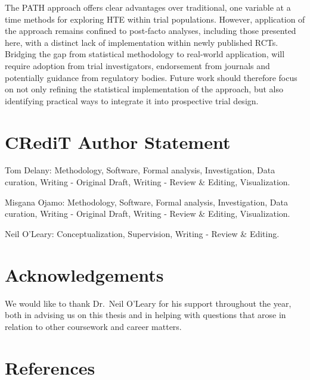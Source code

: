 \documentclass{article}
\begin{document}
The PATH approach offers clear advantages over traditional, one variable
at a time methods for exploring HTE within trial populations. However,
application of the approach remains confined to post-facto analyses,
including those presented here, with a distinct lack of implementation
within newly published RCTs. Bridging the gap from statistical
methodology to real-world application, will require adoption from trial
investigators, endorsement from journals and potentially guidance from
regulatory bodies. Future work should therefore focus on not only
refining the statistical implementation of the approach, but also
identifying practical ways to integrate it into prospective trial
design.

\section{CRediT Author Statement}\label{credit-author-statement}

Tom Delany: Methodology, Software, Formal analysis, Investigation, Data
curation, Writing - Original Draft, Writing - Review \& Editing,
Visualization.

Misgana Ojamo: Methodology, Software, Formal analysis, Investigation,
Data curation, Writing - Original Draft, Writing - Review \& Editing,
Visualization.

Neil O'Leary: Conceptualization, Supervision, Writing - Review \&
Editing.

\section{Acknowledgements}\label{acknowledgements}

We would like to thank Dr.~Neil O'Leary for his support throughout the
year, both in advising us on this thesis and in helping with questions
that arose in relation to other coursework and career matters.

\section{References}\label{references}
\end{document}
